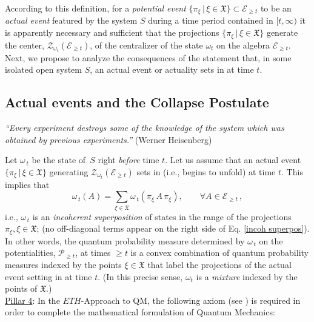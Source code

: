 \documentclass[a4paper,11pt]{article}
\begin{document}
According to this definition, for a \textit{potential event} 
$\big\{\pi_{\xi}\,\vert\, \xi \in \mathfrak{X}\big\}\subset \mathcal{E}_{\geq t}$ to be an
\textit{actual event} featured by the system $S$ during a time period contained in $[t, \infty)$ it is apparently necessary 
and sufficient that the projections $\big\{\pi_{\xi}\,\vert\, \xi \in \mathfrak{X}\big\}$ generate the center, 
$\mathcal{Z}_{\omega_t}(\mathcal{E}_{\geq t})$, of the centralizer of the state $\omega_t$ on the algebra 
$\mathcal{E}_{\geq t}$.\\ 

Next, we propose to analyze the consequences of the statement that, in some isolated open system $S$, 
an actual event or actuality sets in at time $t$. 

\subsection{Actual events and the Collapse Postulate}

\hspace{0.5cm}\textit{``Every experiment destroys some of the knowledge of the system which was obtained by previous experiments.''} (Werner Heisenberg)

Let $\omega_{\,t}$ be the state of~$S$ right \textit{before} time $t$. Let us assume that an actual event
 $\big\{ \pi_{\xi} \,|\, \xi \in \mathfrak{X} \big\}$ generating $\mathcal{Z}_{\omega_t}(\mathcal{E}_{\geq t})$ sets in (i.e., begins to unfold) at time $t$. This implies that
 \begin{equation}\label{incoh superpos}
 \omega_{\,t}(A)= \sum_{\xi \in \mathfrak{X}} \omega_{\,t}(\pi_{\xi} \,A\, \pi_{\xi}), \qquad \forall A \in \mathcal{E}_{\geq t}\,,
 \end{equation}
 i.e., $\omega_{\,t}$ is an \textit{incoherent superposition} of states in the range of the projections 
 $\pi_{\xi}, \xi \in \mathfrak{X}$; (no off-diagonal terms appear on the right side of Eq. \eqref{incoh superpos}). In other words, the quantum probability measure determined by $\omega_{\,t}$ on the potentialities, $\mathcal{P}_{\geq t}$, at times $\geq t$ is a convex combination of quantum probability measures indexed by the points $\xi \in \mathfrak{X}$ that label the projections of the actual event setting in at time $t$. (In this precise sense, $\omega_t$ is a \textit{mixture} indexed by the points of $\mathfrak{X}$.)\\
 
\underline{Pillar 4}:  In the $ETH$-Approach to QM, the following axiom (see \cite{Fr1}) is required in order to complete the mathematical formulation of Quantum Mechanics:
\end{document}
